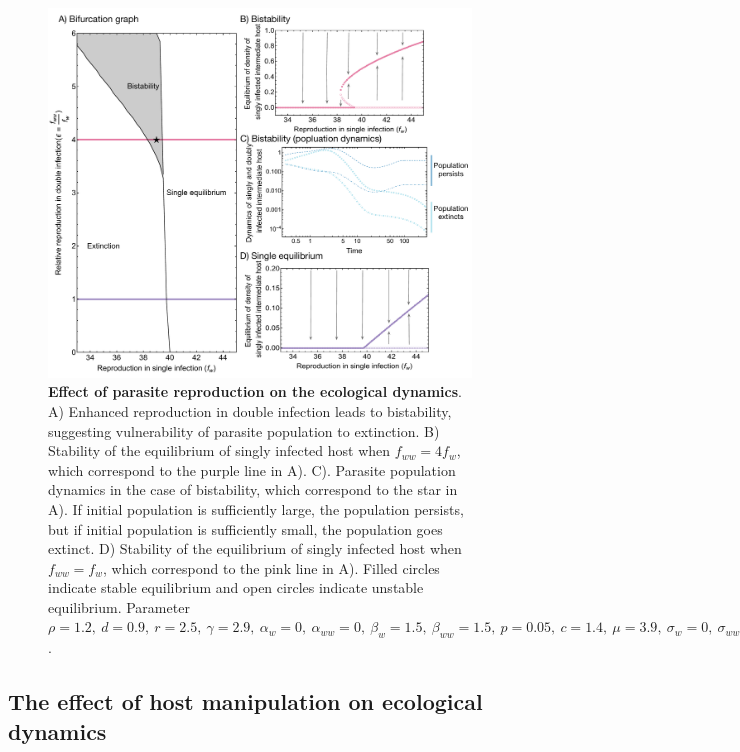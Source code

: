 \documentclass[a4paper]{scrartcl}
\begin{document}
\begin{figure}[!ht]
\captionsetup{format=plain}
\includegraphics[width = \textwidth]{Figures/reproduction_bifurcation2.pdf}
\caption{\textbf{Effect of parasite reproduction on the ecological dynamics}. A) Enhanced reproduction in double infection leads to bistability, suggesting vulnerability of parasite population to extinction. B) Stability of the equilibrium of singly infected host when $f_{ww} = 4 f_w$, which correspond to the purple line in A). C). Parasite population dynamics in the case of bistability, which correspond to the star in A). If initial population is sufficiently large, the population persists, but if initial population is sufficiently small, the population goes extinct. D) Stability of the equilibrium of singly infected host when $f_{ww} =  f_w$, which correspond to the pink line in A). Filled circles indicate stable equilibrium and open circles indicate unstable equilibrium. Parameter $\rho = 1.2, \  d = 0.9, \  r = 2.5, \ \gamma = 2.9, \ \alpha_w = 0, \ \alpha_{ww} =  0, \ \beta_w = 1.5, \ \beta_{ww} = 1.5, \ p = 0.05, \  c = 1.4, \ \mu = 3.9,  \ \sigma_w = 0, \ \sigma_{ww} = 0, \  q = 0.05, \ \delta = 0.9, \ k = 0.26, \ h = 0.6$.
}
\label{fig:bistability}
\end{figure}

\subsection*{The effect of host manipulation on ecological dynamics}
\end{document}

